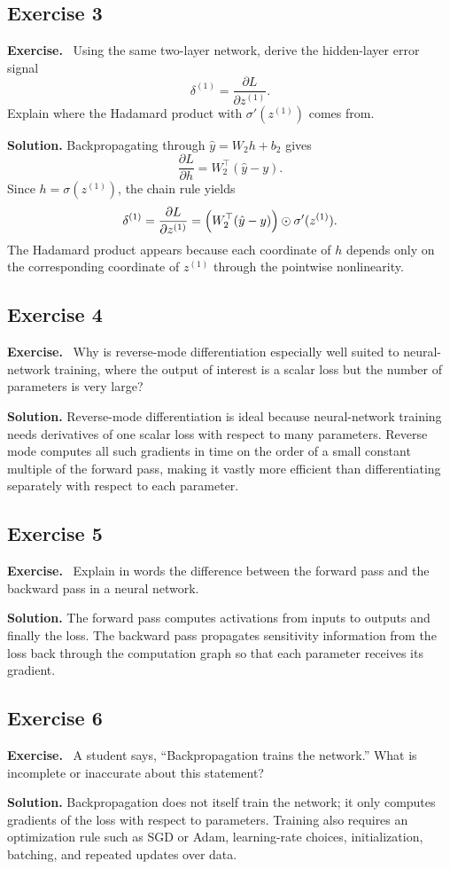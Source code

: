 \documentclass[11pt]{article}
\newenvironment{exercisebox}{\begin{framed}\noindent\textbf{Exercise.}\ }{\end{framed}}
\begin{document}
\subsection*{Exercise 3}
\begin{exercisebox}
Using the same two-layer network, derive the hidden-layer error signal
\[
\delta^{(1)}=\frac{\partial L}{\partial z^{(1)}}.
\]
Explain where the Hadamard product with $\sigma'(z^{(1)})$ comes from.
\end{exercisebox}
\textbf{Solution.} Backpropagating through $\hat y=W_2h+b_2$ gives
\[
\frac{\partial L}{\partial h}=W_2^\top(\hat y-y).
\]
Since $h=\sigma(z^{(1)})$, the chain rule yields
\[
\delta^{(1)}=\frac{\partial L}{\partial z^{(1)}}=\Bigl(W_2^\top(\hat y-y)\Bigr)\odot \sigma'(z^{(1)}).
\]
The Hadamard product appears because each coordinate of $h$ depends only on the corresponding coordinate of $z^{(1)}$ through the pointwise nonlinearity.

\subsection*{Exercise 4}
\begin{exercisebox}
Why is reverse-mode differentiation especially well suited to neural-network training, where the output of interest is a scalar loss but the number of parameters is very large?
\end{exercisebox}
\textbf{Solution.} Reverse-mode differentiation is ideal because neural-network training needs derivatives of one scalar loss with respect to many parameters. Reverse mode computes all such gradients in time on the order of a small constant multiple of the forward pass, making it vastly more efficient than differentiating separately with respect to each parameter.

\subsection*{Exercise 5}
\begin{exercisebox}
Explain in words the difference between the forward pass and the backward pass in a neural network.
\end{exercisebox}
\textbf{Solution.} The forward pass computes activations from inputs to outputs and finally the loss. The backward pass propagates sensitivity information from the loss back through the computation graph so that each parameter receives its gradient.

\subsection*{Exercise 6}
\begin{exercisebox}
A student says, ``Backpropagation trains the network.'' What is incomplete or inaccurate about this statement?
\end{exercisebox}
\textbf{Solution.} Backpropagation does not itself train the network; it only computes gradients of the loss with respect to parameters. Training also requires an optimization rule such as SGD or Adam, learning-rate choices, initialization, batching, and repeated updates over data.
\end{document}
